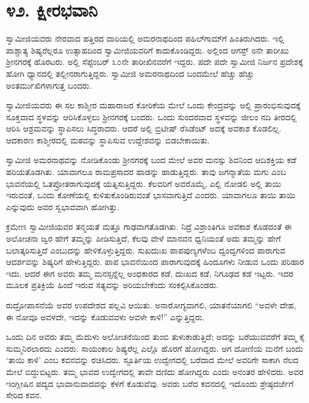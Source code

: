 
\chapter*{೪೨. ಕ್ಷೀರಭವಾನಿ}

 ಸ್ವಾಮೀಜಿಯವರು ನೇರವಾದ ಹತ್ತಿರದ ದಾರಿಯಲ್ಲಿ ಅಮರನಾಥದಿಂದ ಪಹಿಲ್‍ಗಾಮ್‍ಗೆ ಹಿಂತಿರುಗಿದರು. ಇಲ್ಲಿ ಪಾಶ್ಚಾತ್ಯ ಶಿಷ್ಯರೆಲ್ಲರೂ ಉತ್ಸಾಹದಿಂದ ಸ್ವಾಮೀಜಿಯವರಿಗೆ ಕಾದುಕೊಂಡಿದ್ದರು. ಅಲ್ಲಿಂದ ಆಗಸ್ಟ್ ೮ನೇ ತಾರೀಖು ಶ‍್ರೀನಗರಕ್ಕೆ ಹೊರಟರು. ಅಲ್ಲಿ ಸೆಪ್ಟೆಂಬರ್ ೩೦ನೇ ತಾರೀಖಿನವರೆಗೆ ಇದ್ದರು. ಪದೇ ಪದೇ ಸ್ವಾಮೀಜಿ ನಿರ್ಜನ ಪ್ರದೇಶಕ್ಕೆ ಹೋಗಿ ಧ್ಯಾನದಲ್ಲಿ ತಲ್ಲೀನರಾಗುತ್ತಿದ್ದರು. ಸ್ವಾಮೀಜಿ ಅಮರನಾಥದಿಂದ ಬಂದಮೇಲೆ ಹೆಚ್ಚು ಹೆಚ್ಚು ಅಂತರ್ಮುಖಿಗಳಾಗುತ್ತ ಬಂದರು. 

 ಸ್ವಾಮೀಜಿಯವರು ಈ ಸಲ ಕಾಶ್ಮೀರ ಮಹಾರಾಜರ ಕೋರಿಕೆಯ ಮೇಲೆ ಒಂದು ಕೇಂದ್ರವನ್ನು ಅಲ್ಲಿ ಪ್ರಾರಂಭಿಸುವುದಕ್ಕೆ ಸೂಕ್ತವಾದ ಸ್ಥಳವನ್ನು ಆರಿಸಿಕೊಳ್ಳಲು ಶ‍್ರೀನಗರಕ್ಕೆ ಬಂದರು. ಒಂದು ಸುಂದರವಾದ ಸ್ಥಳವನ್ನು ಜೀಲಂ ನದಿ ತೀರದಲ್ಲಿ ಆರಿಸಿ ಆಶ್ರಮವನ್ನು ಸ್ಥಾಪಿಸಲು ಸಿದ್ಧರಾದರು. ಆದರೆ ಅಲ್ಲಿ ಬ್ರಿಟೀಷ್ ರೆಸಿಡೆಂಟ್ ಅದಕ್ಕೆ ಅವಕಾಶ ಕೊಡಲಿಲ್ಲ. ಆದಕಾರಣ ಕಾಶ್ಮೀರದಲ್ಲಿ ಮಠವನ್ನು ಸ್ಥಾಪಿಸುವ ಉದ್ದೇಶವನ್ನು ಬಿಡಬೇಕಾಯಿತು. 

 ಸ್ವಾಮೀಜಿ ಅಮರನಾಥವನ್ನು ನೋಡಿಕೊಂಡು ಶ‍್ರೀನಗರಕ್ಕೆ ಬಂದ ಮೇಲೆ ಅವರ ಮನಸ್ಸು ಶಿವನಿಂದ ಆದಿಶಕ್ತಿಯ ಕಡೆ ಹರಿಯತೊಡಗಿತು. ಯಾವಾಗಲೂ ರಾಮಪ್ರಸಾದರ ಹಾಡನ್ನು ಹಾಡುತ್ತಿದ್ದರು. ತಾವು ಜಗನ್ಮಾತೆಯ ಮಗು ಎಂಬ ಭಾವನೆಯಲ್ಲಿ ಓತಪ್ರೋತರಾಗುವುದಕ್ಕೆ ಯತ್ನಿಸುತ್ತಿದ್ದರು. ಕೆಲವರಿಗೆ ಅವರೊಮ್ಮೆ, ಎಲ್ಲಿ ನೋಡಲಿ ಅಲ್ಲಿ ತಾಯಿ ಇರುವಂತೆ, ಒಂದು ಕೋಣೆಯಲ್ಲಿ ಕುಳಿತುಕೊಂಡಿರುವಂತೆ ಭಾಸವಾಗುತ್ತಿದೆ ಎಂದರು. ಯಾವಾಗಲೂ ತಾಯಿ ತಾಯಿ ಎನ್ನುವುದು ಅವರ ಸ್ವಭಾವವಾಗಿ ಹೋಗಿತ್ತು. 

 ಕ್ರಮೇಣ ಸ್ವಾಮೀಜಿಯವರ ತನ್ಮಯತೆ ಮತ್ತೂ ಗಾಢವಾಗತೊಡಗಿತು. ನಿದ್ರೆ ವಿಶ್ರಾಂತಿಗೂ ಅವಕಾಶ ಕೊಡದಂತೆ ಈ ಅಲೋಚನಾ ಜ್ವರ ಹೇಗೆ ತಮ್ಮನ್ನು ಪೀಡಿಸುತ್ತಿದೆ, ಕೆಲವು ವೇಳೆ ಮಾನವನ ಧ್ವನಿಯಂತೆ ಅದು ತಮ್ಮನ್ನು ಹೇಗೆ ಬಲಾತ್ಕರಿಸುತ್ತಿದೆ ಎಂಬುದನ್ನು ಹೇಳಿಕೊಳ್ಳುತ್ತಿದ್ದರು. ಸುಖದುಃಖ ಪಾಪಪುಣ್ಯಗಳೆಂಬ ದ್ವಂದ್ವಗಳಿಂದ ಪಾರಾಗುವ ಆದರ್ಶವನ್ನು ಶಿಷ್ಯರಿಗೆ ಹೇಳುತ್ತಿದ್ದರು. ಪಾಪ ಭಾವನೆಯಿಂದ ಪಾರಾಗುವುದಕ್ಕೆ ಹಿಂದೂಗಳು ನೀಡುವ ಒಂದು ಪರಿಹಾರ ಇದು. ಆದರೆ ಈಗ ಅವರು ತಮ್ಮ ಮನಸ್ಸನ್ನೆಲ್ಲ ಅಂಧಕಾರದ ಕಡೆ, ದುಃಖದ ಕಡೆ, ನಿಗೂಢದ ಕಡೆ ಇಟ್ಟರು. ಇದರ ಮೂಲಕ ಪ್ರತಿಕ್ರಿಯೆ ಹಿಂದೆ ಇರುವ ಸತ್ಯವನ್ನು ಅರಿಯಬೇಕೆಂದು ಸಂಕಲ್ಪಿಸಿಕೊಂಡರು. 

 ರುದ್ರೋಪಾಸನೆಯೆ ಅವರ ಉಪದೇಶದ ಪಲ್ಲವಿ ಆಯಿತು. ಅನಾರೋಗ್ಯವಾಗಲಿ, ಯಾತನೆಯಾಗಲಿ “ಅವಳೇ ದೇಹ, ಈ ನೋವೂ ಅವಳದೇ, ಇದನ್ನು ಕೊಡುವವಳು ಅವಳೇ ಕಾಳಿ!” ಎನ್ನುತ್ತಿದ್ದರು. 

 ಒಂದು ದಿನ ಅವರು ತಮ್ಮ ಮೆದುಳು ಅಲೋಚನೆಯಿಂದ ತುಂಬಿ ತುಳುಕಾಡುತ್ತಿದೆ; ಅದನ್ನು ಬರೆಯುವವರೆಗೆ ತಮ್ಮ ಕೈ ಸುಮ್ಮನಿರಲಾರದು ಎಂದರು. ಸಾಯಂಕಾಲ ಶಿಷ್ಯರೆಲ್ಲ ಎಲ್ಲೊ ಹೊರಗೆ ಹೋಗಿದ್ದರು. ಆಗ ದೋಣಿಯ ಮನೆಗೆ ಬಂದು ‘ತಾಯಿ ಕಾಳಿ’ ಎಂಬ ಕವನವನ್ನು ರಚಿಸಿದರು. ಸ್ಫೂರ್ತಿಯ ಉದ್ವೇಗದಲ್ಲಿ ಬರೆದಾದ ಮೇಲೆ ಅವರಿಗೇ ಸಾಕಾಗಿ ನೆಲದ ಮೇಲೆ ಬಿದ್ದುಬಿಟ್ಟರು. ತಮ್ಮ ಭಾವದ ಉದ್ವೇಗದಲ್ಲಿ ತಾವೇ ದಣಿದು ಹೋಗಿದ್ದರು ಎಂದು ಅನಂತರ ಹೇಳಿದರು. ಅವರ ಇಂಗ್ಲೀಷಿನ ಪದ್ಯದ ಭಾವಾನುವಾದವನ್ನು ಕೆಳಗೆ ಕೊಡುವೆವು. ಅವರು ಬರೆದ ಕವನದಲ್ಲಿ ಇದೊಂದು ಶ್ರೇಷ್ಠದರ್ಜೆಗೆ ಸೇರಿದ ಕವನ.

